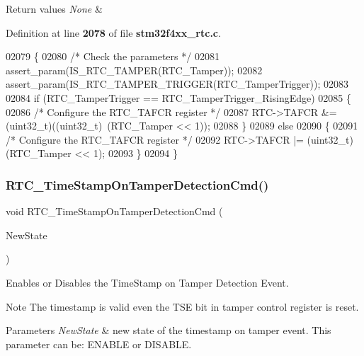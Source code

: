 \begin{DoxyRetVals}{Return values}
{\em None} & \\
\hline
\end{DoxyRetVals}


Definition at line \textbf{ 2078} of file \textbf{ stm32f4xx\+\_\+rtc.\+c}.


\begin{DoxyCode}
02079 \{
02080   \textcolor{comment}{/* Check the parameters */}
02081   assert_param(IS_RTC_TAMPER(RTC\_Tamper)); 
02082   assert_param(IS_RTC_TAMPER_TRIGGER(RTC\_TamperTrigger));
02083  
02084   \textcolor{keywordflow}{if} (RTC\_TamperTrigger == RTC_TamperTrigger_RisingEdge)
02085   \{  
02086     \textcolor{comment}{/* Configure the RTC\_TAFCR register */}
02087     RTC->TAFCR &= (uint32\_t)((uint32\_t)~(RTC\_Tamper << 1)); 
02088   \}
02089   \textcolor{keywordflow}{else}
02090   \{ 
02091     \textcolor{comment}{/* Configure the RTC\_TAFCR register */}
02092     RTC->TAFCR |= (uint32\_t)(RTC\_Tamper << 1);  
02093   \}  
02094 \}
\end{DoxyCode}
\mbox{\label{group__RTC__Group9_ga29c82fceefd21a78dc55ccc5bcc1ed59}} 
\subsubsection{R\+T\+C\+\_\+\+Time\+Stamp\+On\+Tamper\+Detection\+Cmd()}
{\footnotesize\ttfamily void R\+T\+C\+\_\+\+Time\+Stamp\+On\+Tamper\+Detection\+Cmd (\begin{DoxyParamCaption}\item[{\textbf{ Functional\+State}}]{New\+State }\end{DoxyParamCaption})}



Enables or Disables the Time\+Stamp on Tamper Detection Event. 

\begin{DoxyNote}{Note}
The timestamp is valid even the T\+SE bit in tamper control register is reset. 
\end{DoxyNote}

\begin{DoxyParams}{Parameters}
{\em New\+State} & new state of the timestamp on tamper event. This parameter can be\+: E\+N\+A\+B\+LE or D\+I\+S\+A\+B\+LE. \\
\hline
\end{DoxyParams}

